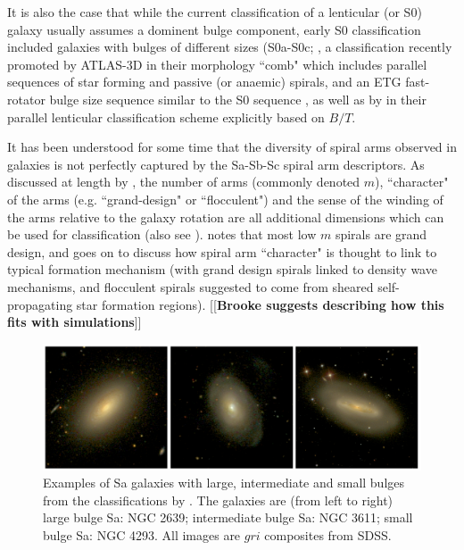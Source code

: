 \documentclass[usenatbib]{mn2e}
\newcommand{\comment}[2][todo]{{\color{#1}[[{\bf #2}]]}}
\begin{document}
 It is also the case that while the current classification of a lenticular (or S0) galaxy usually assumes a dominent bulge component, early S0 classification included galaxies with bulges of different sizes (S0a-S0c; \citealt{SpitzerBaade1951, vandenBergh1976}, a classification recently promoted by ATLAS-3D in their morphology ``comb" which includes parallel sequences of star forming and passive (or anaemic) spirals, and an ETG fast-rotator bulge size sequence similar to the S0 sequence \citep{2011MNRAS.416.1680C}, as well as by \citet{Kormendy2012} in their parallel lenticular classification scheme explicitly based on $B/T$. 



It has been understood for some time that the diversity of spiral arms observed in galaxies is not perfectly captured by the Sa-Sb-Sc spiral arm descriptors. As discussed at length by \citet{Buta2013}, the number of arms (commonly denoted $m$), ``character" of the arms (e.g. ``grand-design" or ``flocculent") and the sense of the winding of the arms relative to the galaxy rotation are all additional dimensions which can be used for classification (also see \citealt{1987ApJ...314....3E,AnnLee2013}). \citet{Buta2013} notes that most low $m$ spirals are grand design, and goes on to discuss how spiral arm ``character" is thought to link to typical formation mechanism (with grand design spirals linked to density wave mechanisms, and flocculent spirals suggested to come from sheared self-propagating star formation regions). \comment{Brooke suggests describing how this fits with simulations}

\begin{figure}
\includegraphics[width=160mm]{ExampleSas.png}
\caption{Examples of Sa galaxies with large, intermediate and small bulges from the classifications by \citet{Hogg1993}.  The galaxies are (from left to right) large bulge Sa: NGC 2639; intermediate bulge Sa: NGC 3611; small bulge Sa: NGC 4293. All images are $gri$ composites from SDSS. \label{Sa}}
\end{figure}
\end{document}
